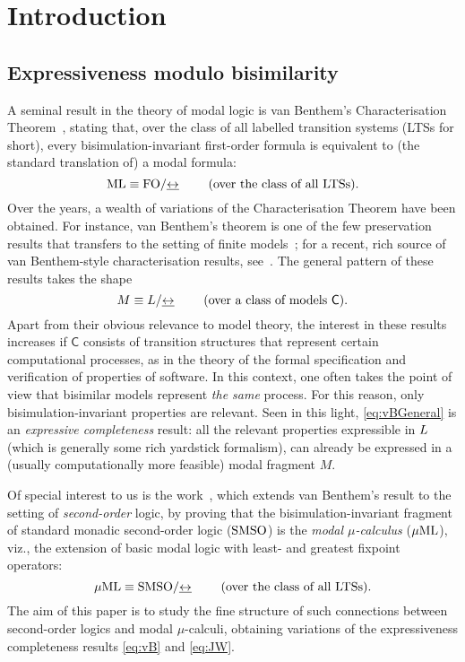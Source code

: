 
\section{Introduction}
   \label{sec:intro}

\subsection{Expressiveness modulo bisimilarity}

A seminal result in the theory of modal logic is van Benthem's Characterisation
Theorem~\cite{vanBenthemPhD}, stating that, over  the class of all labelled transition systems (LTSs for short),  every bisimulation-invariant
first-order formula is equivalent to (the standard
translation of) a modal formula:
\begin{equation}
\label{eq:vB}
\mathrm{ML} \equiv \mathrm{FO}/{\mathrel{\underline{\leftrightarrow}}}  \qquad  \text{ (over the class of all LTSs)}.
\end{equation}
Over the years, a wealth of variations of the Characterisation Theorem have been
obtained.
For instance, van Benthem's theorem is one of the few
preservation results that transfers to the setting of finite
models~\cite{rose:moda97}; for a recent, rich source of van Benthem-style
characterisation results, see~\cite{DawarO09}. 
The general pattern of these results takes the shape
\begin{equation}
\label{eq:vBGeneral}
M \equiv L/{\mathrel{\underline{\leftrightarrow}}}  \qquad  
\text{ (over a class of models $\mathsf{C}$)}.
\end{equation}
Apart from their obvious relevance to model theory, the interest in these 
results increases if $\mathsf{C}$ consists of transition structures that 
represent certain computational processes, as in the theory of the formal 
specification and verification of properties of software.
In this context, one often takes the point of view that bisimilar models 
represent \emph{the same} process. 
For this reason, only bisimulation-invariant properties are relevant.
Seen in this light, \eqref{eq:vBGeneral} is an \emph{expressive completeness} 
result: all the relevant properties expressible in $L$ (which is generally
some rich yardstick formalism), can already be expressed in a (usually
computationally more feasible) modal fragment $M$.

Of special interest to us is the work~\cite{Jan96}, which extends van Benthem's
result to the setting of \emph{second-order} logic, by proving that the 
bisimulation-invariant fragment of standard monadic second-order logic 
($\mathrm{SMSO}$) is the \emph{modal $\mu$-calculus} ($\mu\mathrm{ML}$), viz., the extension of
basic modal logic with least- and greatest fixpoint operators:
\begin{equation}
\label{eq:JW}
\mu\mathrm{ML} \equiv \mathrm{SMSO}/{\mathrel{\underline{\leftrightarrow}}}  \qquad  \text{ (over the class of all LTSs)}.
\end{equation}
The aim of this paper is to study the fine structure of such connections between
second-order logics and modal $\mu$-calculi, obtaining variations of the
expressiveness completeness results \eqref{eq:vB} and \eqref{eq:JW}.

